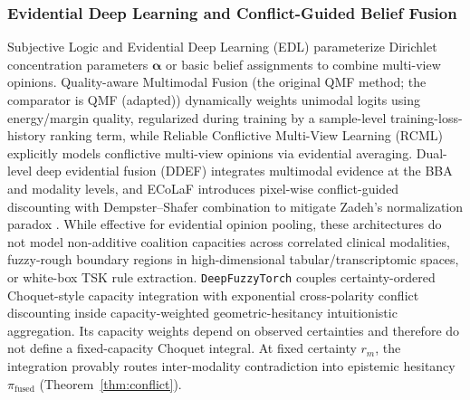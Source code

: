 \documentclass[10pt,twocolumn]{article}
\begin{document}
\subsubsection{Evidential Deep Learning and Conflict-Guided Belief Fusion}
Subjective Logic and Evidential Deep Learning (EDL)
\cite{sensoy2018evidential,han2022trusted,shao2024dual,xu2024reliable} parameterize Dirichlet
concentration parameters
$\bm{\alpha}$ or basic belief assignments to combine multi-view opinions. Quality-aware
Multimodal Fusion (the original QMF method; the comparator is QMF (adapted))
\cite{zhang2023provable} dynamically weights unimodal logits using energy/margin quality,
regularized during training by a sample-level training-loss-history ranking term, while
Reliable Conflictive Multi-View Learning
(RCML) \cite{xu2024reliable} explicitly models conflictive multi-view opinions via evidential
averaging. Dual-level deep evidential fusion (DDEF) \cite{shao2024dual} integrates multimodal
evidence at the BBA and modality levels, and ECoLaF \cite{deregnaucourt2025ecolaf} introduces
pixel-wise conflict-guided discounting with Dempster--Shafer combination to mitigate Zadeh's
normalization paradox \cite{zadeh1986simple}. While effective for evidential opinion pooling,
these architectures do not model non-additive coalition capacities across correlated clinical
modalities, fuzzy-rough boundary regions in high-dimensional tabular/transcriptomic spaces, or
white-box TSK rule extraction. \texttt{DeepFuzzyTorch} couples certainty-ordered
Choquet-style capacity integration \cite{choquet1954theory,xu2010choquet} with exponential
cross-polarity conflict discounting inside capacity-weighted geometric-hesitancy intuitionistic
aggregation. Its capacity weights depend on observed certainties and therefore do not define a
fixed-capacity Choquet integral. At fixed certainty $r_m$, the integration provably routes
inter-modality contradiction into epistemic hesitancy $\pi_{\text{fused}}$
(Theorem~\ref{thm:conflict}).
\end{document}
